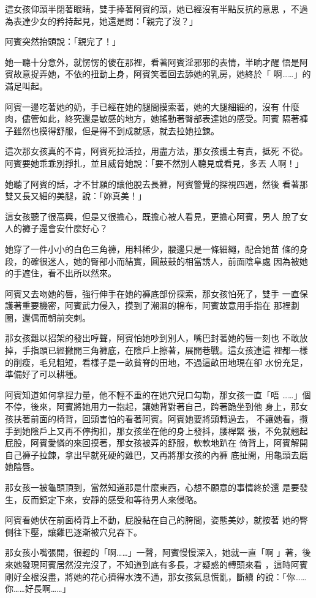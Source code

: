 這女孩仰頭半閉著眼睛，雙手捧著阿賓的頭，她已經沒有半點反抗的意思
，不過為表達少女的矜持起見，她還是問：「親完了沒？」

阿賓突然抬頭說：「親完了！」

她一聽十分意外，就愣愣的傻在那裡，看著阿賓淫邪邪的表情，半晌才醒
悟是阿賓故意捉弄她，不依的扭動上身，阿賓笑著回去舔她的乳房，她終於「
啊……」的滿足叫起。

阿賓一邊吃著她的奶，手已經在她的腿間摸索著，她的大腿細細的，沒有
什麼肉，儘管如此，終究還是敏感的地方，她搖動著臀部表達她的感受。阿賓
隔著褲子雖然也摸得舒服，但是得不到成就感，就去拉她拉鍊。

這次那女孩真的不肯，阿賓死拉活拉，用盡方法，那女孩護土有責，抵死
不從。阿賓要她乖乖別掙扎，並且威脅她說：「要不然別人聽見或看見，多丟
人啊！」

她聽了阿賓的話，才不甘願的讓他脫去長褲，阿賓警覺的探視四週，然後
看著那雙又長又細的美腿，說：「妳真美！」

這女孩聽了很高興，但是又很擔心，既擔心被人看見，更擔心阿賓，男人
脫了女人的褲子還會安什麼好心？

她穿了一件小小的白色三角褲，用料稀少，腰邊只是一條細繩，配合她苗
條的身段，的確很迷人，她的臀部小而結實，圓鼓鼓的相當誘人，前面陰阜處
因為被她的手遮住，看不出所以然來。

阿賓又去吻她的唇，強行伸手在她的褲底部份探索，那女孩怕死了，雙手
一直保護著重要機密，阿賓武力侵入，摸到了潮濕的棉布，阿賓故意用手指在
那裡劃圈，還偶而朝前突刺。

那女孩難以招架的發出哼聲，阿賓怕她吵到別人，嘴巴封著她的唇一刻也
不敢放掉，手指頭已經撇開三角褲底，在陰戶上擦著，展開巷戰。這女孩連這
裡都一樣的削瘦，毛兒粗短，看樣子是一畝貧脊的田地，不過這畝田地現在卻
水份充足，準備好了可以耕種。

阿賓知道如何拿捏力量，他不輕不重的在她穴兒口勾勒，那女孩一直「唔
……」個不停，後來，阿賓將她用力一抱起，讓她背對著自己，跨著跪坐到他
身上，那女孩扶著前面的椅背，回頭害怕的看著阿賓。阿賓她要將頭轉過去，
不讓她看，攬手到她陰戶上又再不停掏扣，那女孩坐在他的身上發抖，腰桿緊
張，不免就翹起屁股，阿賓愛憐的來回摸著，那女孩被弄的舒服，軟軟地趴在
倚背上，阿賓解開自己褲子拉鍊，拿出早就死硬的雞巴，又再將那女孩的內褲
底扯開，用龜頭去磨她陰唇。

那女孩一被龜頭頂到，當然知道那是什麼東西，心想不願意的事情終於還
是要發生，反而鎮定下來，安靜的感受和等待男人來侵略。

阿賓看她伏在前面椅背上不動，屁股黏在自己的胯間，姿態美妙，就按著
她的臀側往下壓，讓雞巴逐漸被穴兒吞下。

那女孩小嘴張開，很輕的「啊……」一聲，阿賓慢慢深入，她就一直「啊
」著，後來她發現阿賓居然沒完沒了，不知道到底有多長，才疑惑的轉頭來看
，這時阿賓剛好全根沒盡，將她的花心擠得水洩不通，那女孩氣息慌亂，斷續
的說：「你……你……好長啊……」

